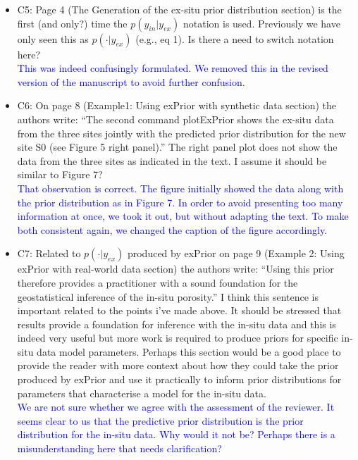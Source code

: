 \documentclass{article}
\begin{document}
\begin{itemize}
    \item C5: Page 4 (The Generation of the ex-situ prior distribution section) is the first (and only?) time the $p(y_{in}|y_{ex})$ notation is used. Previously we have only seen this as $p(\cdot|y_{ex})$ (e.g., eq 1). Is there a need to switch notation here?\\
    \textcolor{blue}{This was indeed confusingly formulated. We removed this in the revised version of the manuscript to avoid further confusion.}
    
    \item C6: On page 8 (Example1: Using exPrior with synthetic data section) the authors write: “The second command plotExPrior shows the ex-situ data from the three sites jointly with the predicted prior distribution for the new site S0 (see Figure 5 right panel).” The right panel plot does not show the data from the three sites as indicated in the text. I assume it should be similar to Figure 7?\\
    \textcolor{blue}{That observation is correct. The figure initially showed the data along with the prior distribution as in Figure 7. In order to avoid presenting too many information at once, we took it out, but without adapting the text. To make both consistent again, we changed the caption of the figure accordingly.}
    
    \item C7: Related to $p(\cdot|y_{ex})$ produced by exPrior on page 9 (Example 2: Using exPrior with real-world data section) the authors write: “Using this prior therefore provides a practitioner with a sound foundation for the geostatistical inference of the in-situ porosity.” I think this sentence is important related to the points i’ve made above. It should be stressed that results provide a foundation for inference with the in-situ data and this is indeed very useful but more work is required to produce priors for specific in-situ data model parameters. Perhaps this section would be a good place to provide the reader with more context about how they could  take the prior produced by exPrior and use it practically to inform prior distributions for parameters that characterise a model for the in-situ data.\\
    \textcolor{blue}{We are not sure whether we agree with the assessment of the reviewer. It seems clear to us that the predictive prior distribution is the prior distribution for the in-situ data. Why would it not be? Perhaps there is a misunderstanding here that needs clarification?}
    

\end{itemize}
\end{document}
